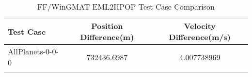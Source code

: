 \begin{table}[htbp!]
\centering
\caption{ FF/WinGMAT EML2HPOP Test Case Comparison}
      \begin{tabular}{lcc}
      \hline\hline
          Test Case & Position Difference(m) & Velocity Difference(m/s) \\
         \hline
         AllPlanets-0-0-0 & 732436.6987 & 4.007738969 \\
      \hline\hline
      \label{Table: EML2HPOP FF-WinGMAT Table} 
\end{tabular}
\end{table}
